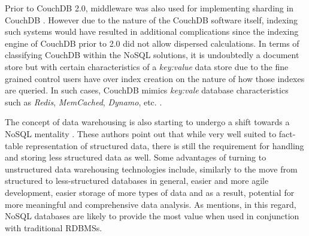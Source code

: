 Prior to CouchDB 2.0, middleware was also used for implementing sharding in CouchDB \cite{CORBELLINI20171}. However due to the nature of the CouchDB software itself, indexing such systems would have resulted in additional complications since the indexing engine of CouchDB prior to 2.0 did not allow dispersed calculations. In terms of classifying CouchDB within the NoSQL solutions, it is undoubtedly a document store but with certain characteristics of a \textit{key:value} data store due to the fine grained control users have over index creation on the nature of how those indexes are queried. In such cases, CouchDB mimics \textit{key:vale} database characteristics such as \textit{Redis}, \textit{MemCached}, \textit{Dynamo}, etc. \cite{MAKRIS201694,CORBELLINI20171,GANESHCHANDRA201513}.

The concept of data warehousing is also starting to undergo a shift towards a NoSQL mentality \cite{BICEVSKA2017104}. These authors point out that while very well suited to fact-table representation of structured data, there is still the requirement for handling and storing less structured data as well. Some advantages of turning to unstructured data warehousing technologies include, similarly to the move from structured to less-structured databases in general, easier and more agile development, easier storage of more types of data and as a result, potential for more meaningful and comprehensive data analysis. As \cite{BICEVSKA2017104} mentions, in this regard, NoSQL databases are likely to provide the most value when used in conjunction with traditional RDBMSs.